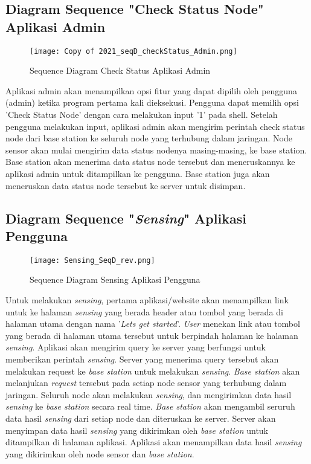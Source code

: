    \subsection{Diagram Sequence "Check Status Node" Aplikasi Admin}
   
   \begin{figure}[H]
    	\centering  
    	\texttt{[image: Copy of 2021\_seqD\_checkStatus\_Admin.png]}  
    	\caption[Sequence Diagram Check Status Aplikasi Admin]{Sequence Diagram Check Status Aplikasi Admin} 
    	\label{fig:Sequence Diagram Check Status Aplikasi Admin} 
    \end{figure}
    
     Aplikasi admin akan menampilkan opsi fitur yang dapat dipilih oleh pengguna (admin) ketika program pertama kali dieksekusi. Pengguna dapat memilih opsi 'Check Status Node' dengan cara melakukan input '1' pada shell. Setelah pengguna melakukan input, aplikasi admin akan mengirim perintah check status node dari base station ke seluruh node yang terhubung dalam jaringan. Node sensor akan mulai mengirim data status nodenya masing-masing, ke base station. Base station akan menerima data status node tersebut dan meneruskannya ke aplikasi admin untuk ditampilkan ke pengguna. Base station juga akan meneruskan data status node tersebut ke server untuk disimpan. 
   
   \subsection{Diagram Sequence "\textit{Sensing}" Aplikasi Pengguna}
   
   \begin{figure}[H]
    	\centering  
    	\texttt{[image: Sensing\_SeqD\_rev.png]}  
    	\caption[Sequence Diagram Sensing Aplikasi Pengguna]{Sequence Diagram Sensing Aplikasi Pengguna} 
    	\label{fig:Sequence Diagram Mulai Sensing Aplikasi Pengguna} 
    \end{figure}
   
   Untuk melakukan \textit{sensing}, pertama aplikasi/website akan menampilkan link untuk ke halaman \textit{sensing} yang berada header atau tombol yang berada di halaman utama dengan nama '\textit{Lets get started}'. \textit{User} menekan link atau tombol yang berada di halaman utama tersebut untuk berpindah halaman ke halaman \textit{sensing}. Aplikasi akan mengirim query ke server yang berfungsi untuk memberikan perintah \textit{sensing}. Server yang menerima query tersebut akan melakukan request ke \textit{base station} untuk melakukan \textit{sensing}. \textit{Base station} akan melanjukan \textit{request} tersebut pada setiap node sensor yang terhubung dalam jaringan. Seluruh node akan melakukan \textit{sensing}, dan mengirimkan data hasil \textit{sensing} ke \textit{base station} secara real time. \textit{Base station} akan mengambil seruruh data hasil \textit{sensing} dari setiap node dan diteruskan ke server. Server akan menyimpan data hasil \textit{sensing} yang dikirimkan oleh \textit{base station} untuk ditampilkan di halaman aplikasi. Aplikasi akan menampilkan data hasil \textit{sensing} yang dikirimkan oleh node sensor dan \textit{base station}.
   
